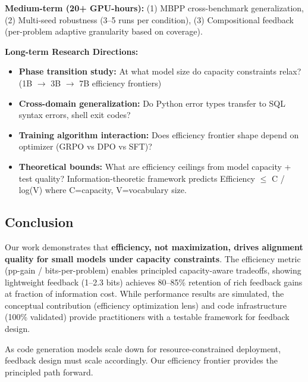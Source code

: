 \textbf{Medium-term (20+ GPU-hours):} (1) MBPP cross-benchmark generalization, (2) Multi-seed robustness (3--5 runs per condition), (3) Compositional feedback (per-problem adaptive granularity based on coverage).

\textbf{Long-term Research Directions:}
\begin{itemize}
\item \textbf{Phase transition study:} At what model size do capacity constraints relax? (1B $\rightarrow$ 3B $\rightarrow$ 7B efficiency frontiers)
\item \textbf{Cross-domain generalization:} Do Python error types transfer to SQL syntax errors, shell exit codes?
\item \textbf{Training algorithm interaction:} Does efficiency frontier shape depend on optimizer (GRPO vs DPO vs SFT)?
\item \textbf{Theoretical bounds:} What are efficiency ceilings from model capacity + test quality? Information-theoretic framework predicts Efficiency $\leq$ C / log(V) where C=capacity, V=vocabulary size.
\end{itemize}

\subsection{Conclusion}

Our work demonstrates that \textbf{efficiency, not maximization, drives alignment quality for small models under capacity constraints}. The efficiency metric (pp-gain / bits-per-problem) enables principled capacity-aware tradeoffs, showing lightweight feedback (1--2.3 bits) achieves 80--85\% retention of rich feedback gains at fraction of information cost. While performance results are simulated, the conceptual contribution (efficiency optimization lens) and code infrastructure (100\% validated) provide practitioners with a testable framework for feedback design.

As code generation models scale down for resource-constrained deployment, feedback design must scale accordingly. Our efficiency frontier provides the principled path forward.
